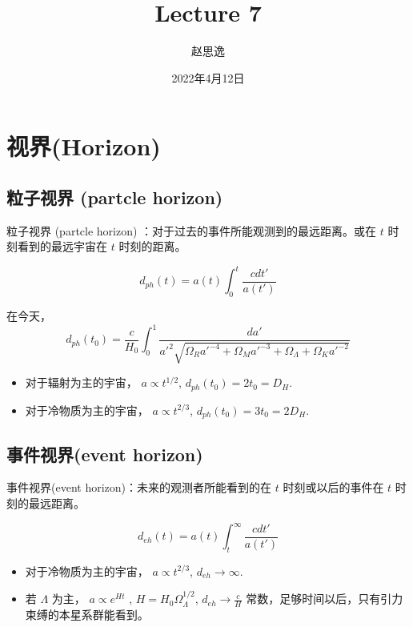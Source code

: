 \documentclass[12pt]{ctexart}
\title{Lecture 7}
\author{赵思逸}
\date{2022年4月12日}
\begin{document}
\maketitle

\section{视界(Horizon)}

\subsection{粒子视界 (partcle horizon)}
粒子视界 (partcle horizon) ：对于过去的事件所能观测到的最远距离。或在 $t$ 时刻看到的最远宇宙在 $t$ 时刻的距离。

\begin{equation}
    d_{ph}(t) = a(t) \int_0^t \frac{cdt'}{a(t')} 
\end{equation}

在今天，
\begin{equation}
    d_{ph}(t_0) = \frac{c}{H_0}\int_0^1 \frac{da'}{a'^2 \sqrt{\Omega_R a'^{-4}+\Omega_M a'^{-3}+\Omega_\Lambda+\Omega_K a'^{-2}} }
\end{equation}

\begin{itemize}
    \item 对于辐射为主的宇宙， $a\propto t^{1/2}$, $d_{ph}(t_0)=2t_0 = D_H$.
    \item 对于冷物质为主的宇宙， $a\propto t^{2/3}$, $d_{ph}(t_0)=3t_0 = 2 D_H$. 
\end{itemize}

\subsection{事件视界(event horizon)}
事件视界(event horizon)：未来的观测者所能看到的在 $t$ 时刻或以后的事件在 $t$ 时刻的最远距离。

\begin{equation}
    d_{eh}(t) = a(t) \int_t^\infty \frac{cdt'}{a(t')} 
\end{equation}

\begin{itemize}
    \item 对于冷物质为主的宇宙， $a\propto t^{2/3}$, $d_{eh}\to \infty$. 
    \item 若 $\Lambda$ 为主， $a\propto e^{Ht}$ , $H=H_0 \Omega_\Lambda^{1/2}$,  $d_{eh}\to \frac{c}{H}$ 常数，足够时间以后，只有引力束缚的本星系群能看到。 
\end{itemize}
\end{document}
